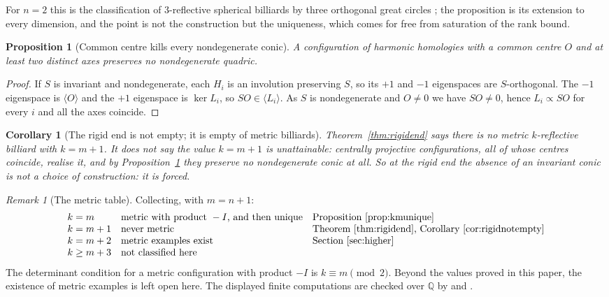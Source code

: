 \documentclass[11pt,a4paper]{article}
\theoremstyle{plain}
\newtheorem{proposition}[theorem]{Proposition}
\newtheorem{corollary}[theorem]{Corollary}
\theoremstyle{definition}
\theoremstyle{remark}
\newtheorem{remark}[theorem]{Remark}
\begin{document}
For $n=2$ this is the classification of $3$-reflective spherical billiards by three
orthogonal great circles \cite{bknz}; the proposition is its extension to every
dimension, and the point is not the construction but the uniqueness, which comes for
free from saturation of the rank bound.

\begin{proposition}[Common centre kills every nondegenerate conic]\label{prop:commoncentre}
A configuration of harmonic homologies with a common centre $O$ and at least two
distinct axes preserves no nondegenerate quadric.
\end{proposition}

\begin{proof}
If $S$ is invariant and nondegenerate, each $H_i$ is an involution preserving $S$, so
its $+1$ and $-1$ eigenspaces are $S$-orthogonal. The $-1$ eigenspace is
$\langle O\rangle$ and the $+1$ eigenspace is $\ker L_i$, so $SO\in\langle
L_i\rangle$. As $S$ is nondegenerate and $O\neq0$ we have $SO\neq0$, hence
$L_i\propto SO$ for every $i$ and all the axes coincide.
\end{proof}

\begin{corollary}[The rigid end is not empty; it is empty of metric billiards]
\label{cor:rigidnotempty}
Theorem~\ref{thm:rigidend} says there is no metric $k$-reflective billiard with
$k=m+1$. It does not say the value $k=m+1$ is unattainable: centrally projective
configurations, all of whose centres coincide, realise it, and by
Proposition~\ref{prop:commoncentre} they preserve no nondegenerate conic at all. So
at the rigid end the absence of an invariant conic is not a choice of construction:
it is forced.
\end{corollary}

\begin{remark}[The metric table]\label{rem:metrictable}
Collecting, with $m=n+1$:
\[
\begin{array}{lll}
 k=m   & \text{metric with product }-I\text{, and then unique} &
 \text{Proposition~\ref{prop:kmunique}}\\
 k=m+1 & \text{never metric} & \text{Theorem~\ref{thm:rigidend}, Corollary~\ref{cor:rigidnotempty}}\\
 k=m+2 & \text{metric examples exist} & \text{Section~\ref{sec:higher}}\\
 k\ge m+3 & \text{not classified here} & \text{}
\end{array}
\]
The determinant condition for a metric configuration with product $-I$ is
$k\equiv m\pmod 2$. Beyond the values proved in this paper, the existence of
metric examples is left open here. The displayed finite computations are checked
over $\mathbb{Q}$ by
 and
.
\end{remark}
\end{document}

